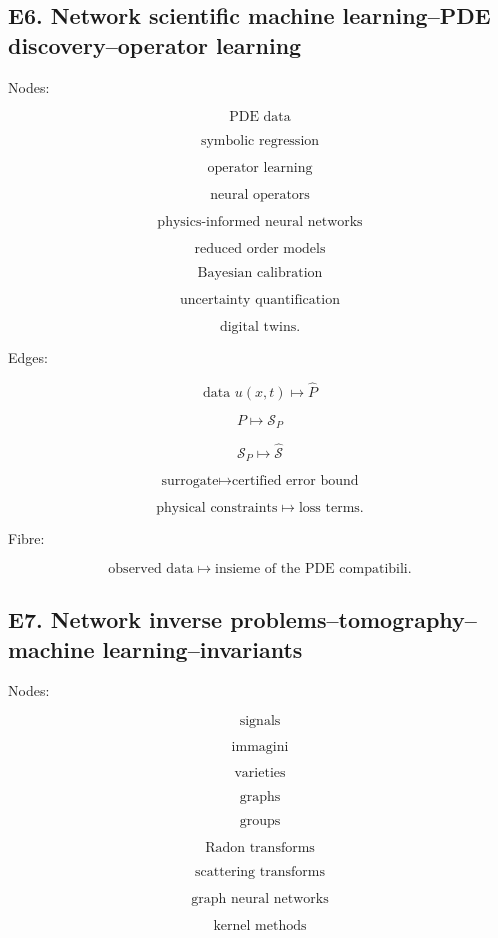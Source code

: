 \documentclass[11pt]{article}
\begin{document}
\subsection{E6. Network scientific machine learning--PDE discovery--operator learning}

Nodes:

\[
\text{PDE data}
\]

\[
\text{symbolic regression}
\]

\[
\text{operator learning}
\]

\[
\text{neural operators}
\]

\[
\text{physics-informed neural networks}
\]

\[
\text{reduced order models}
\]

\[
\text{Bayesian calibration}
\]

\[
\text{uncertainty quantification}
\]

\[
\text{digital twins}.
\]

Edges:

\[
\text{data }u(x,t)\mapsto \hat P
\]

\[
P\mapsto \mathcal S_P
\]

\[
\mathcal S_P\mapsto \widehat{\mathcal S}
\]

\[
\text{surrogate}\mapsto \text{certified error bound}
\]

\[
\text{physical constraints}\mapsto \text{loss terms}.
\]

Fibre:

\[
\text{observed data}
\mapsto
\text{insieme of the PDE compatibili}.
\]



\subsection{E7. Network inverse problems--tomography--machine learning--invariants}

Nodes:

\[
\text{signals}
\]

\[
\text{immagini}
\]

\[
\text{varieties}
\]

\[
\text{graphs}
\]

\[
\text{groups}
\]

\[
\text{Radon transforms}
\]

\[
\text{scattering transforms}
\]

\[
\text{graph neural networks}
\]

\[
\text{kernel methods}
\]
\end{document}
